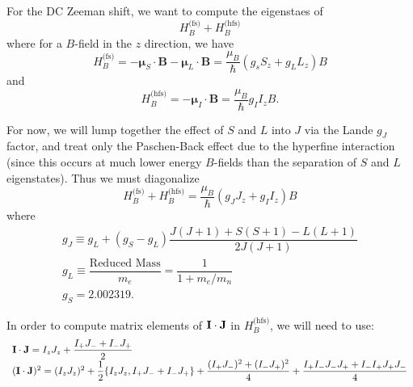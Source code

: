 \documentclass[aps,pra,preprint,groupedaddress]{revtex4}
\begin{document}
For the DC Zeeman shift, we want to compute the eigenstaes of
\begin{equation}
H_B^\text{(fs)}+H_B^\text{(hfs)}
\end{equation}
where for a $B$-field in the $z$ direction, we have
\begin{equation}
H_B^\text{(fs)}=-\mathbf{\mu}_S\cdot \mathbf{B} - \mathbf{\mu}_L\cdot \mathbf{B}
=\dfrac{\mu_B}{\hbar}\left(g_s S_z+g_L L_z\right)B
\end{equation}
and
\begin{equation}
H_B^\text{(hfs)}=-\mathbf{\mu}_I\cdot \mathbf{B}=\dfrac{\mu_B}{\hbar}g_I I_z B.
\end{equation}

For now, we will lump together the effect of $S$ and $L$ into $J$ via the Lande $g_J$ factor, and treat only the Paschen-Back effect due to the hyperfine interaction (since this occurs at much lower energy $B$-fields than the separation of $S$ and $L$ eigenstates). Thus we must diagonalize
\begin{equation}
H_B^\text{(fs)}+H_B^\text{(hfs)}=\dfrac{\mu_B}{\hbar}\left( g_J J_z+g_I I_z\right)B
\end{equation}
where
\begin{equation}
\begin{array}{l}
g_J \equiv g_L + (g_S-g_L)\dfrac{J(J+1)+S(S+1)-L(L+1)}{2J(J+1)}\\
g_L \equiv \dfrac{\text{Reduced Mass}}{m_e}=\dfrac{1}{1+m_e/m_n} \\
g_S=2.002319.
\end{array}
\end{equation}

In order to compute matrix elements of $\mathbf{I}\cdot \mathbf{J}$ in $H_B^\text{(hfs)}$, we will need to use:
\begin{equation}
\begin{array}{l}
\mathbf{I}\cdot \mathbf{J}=I_z J_z+\dfrac{I_+J_-+I_-J_+}{2}\\
(\mathbf{I}\cdot \mathbf{J})^2=(I_zJ_z)^2+\dfrac{1}{2}\{I_zJ_z,I_+J_-+I_-J_+\}+\dfrac{(I_+J_-)^2+(I_-J_+)^2}{4}+\dfrac{I_+I_-J_-J_++I_-I_+J_+J_-}{4}
\end{array}
\end{equation}




\end{document}
